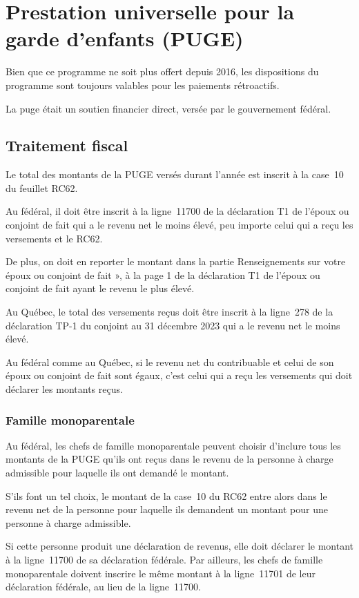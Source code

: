 \section{Prestation universelle pour la garde d'enfants (PUGE)}
\begin{intro}
	Bien que ce programme ne soit plus offert depuis 2016, les dispositions du programme sont toujours valables pour les paiements rétroactifs.
\end{intro}
La \acrfull{puge} était un soutien financier direct, versée par le gouvernement fédéral.


\subsection{Traitement fiscal}
Le total des montants de la PUGE versés durant l'année est inscrit à la case~10 du feuillet RC62. 

Au fédéral, il doit être inscrit à la ligne~11700 de la déclaration T1 de l'époux ou conjoint de fait qui a le revenu net le moins élevé, peu importe celui qui a reçu les versements et le RC62. 

De plus, on doit en reporter le montant dans la partie \og Renseignements sur votre époux ou conjoint de fait », à la page 1 de la déclaration T1 de l'époux ou conjoint de fait ayant le revenu le plus élevé.

Au Québec, le total des versements reçus doit être inscrit à la ligne~278 de la déclaration TP-1 du conjoint au 31 décembre 2023 qui a le revenu net le moins élevé.

Au fédéral comme au Québec, si le revenu net du contribuable et celui de son époux ou conjoint de fait sont égaux, c'est celui qui a reçu les versements qui doit déclarer les montants reçus.

\subsubsection{Famille monoparentale}
Au fédéral, les chefs de famille monoparentale peuvent choisir d'inclure tous les montants de la PUGE qu'ils ont reçus dans le revenu de la personne à charge admissible pour laquelle ils ont demandé le montant.

S'ils font un tel choix, le montant de la case~10 du RC62 entre alors dans le revenu net de la personne pour laquelle ils demandent un montant pour une personne à charge admissible. 

Si cette personne produit une déclaration de revenus, elle doit déclarer le montant à la ligne~11700 de sa déclaration fédérale. Par ailleurs, les chefs de famille monoparentale doivent inscrire le même montant à la ligne~11701 de leur déclaration fédérale, au lieu de la ligne~11700.


